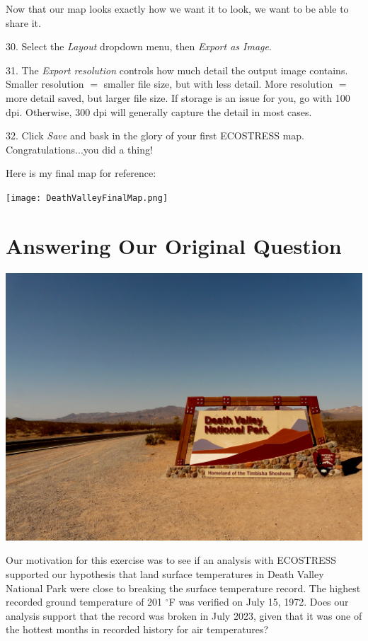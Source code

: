 \documentclass[oneside,a4paper,11pt,explicit]{book}
\begin{document}
Now that our map looks exactly how we want it to look, we want to be able to share it.

30. Select the \textit{Layout} dropdown menu, then \textit{Export as Image}. 

31. The \textit{Export resolution} controls how much detail the output image contains. Smaller resolution $=$ smaller file size, but with less detail. More resolution $=$ more detail saved, but larger file size. If storage is an issue for you, go with 100 dpi. Otherwise, 300 dpi will generally capture the detail in most cases.

32. Click \textit{Save} and bask in the glory of your first ECOSTRESS map. Congratulations...you did a thing!


Here is my final map for reference: 

\centerline{\texttt{[image: DeathValleyFinalMap.png]}}

\section{Answering Our Original Question}

\centerline{\includegraphics[width=.675\textwidth]{DeathValleySign.jpg}}

Our motivation for this exercise was to see if an analysis with ECOSTRESS supported our hypothesis that land surface temperatures in Death Valley National Park were close to breaking the surface temperature record. The highest recorded ground temperature of 201 $^{\circ}$F was verified on July 15, 1972. Does our analysis support that the record was broken in July 2023, given that it was one of the hottest months in recorded history for air temperatures?
\end{document}
